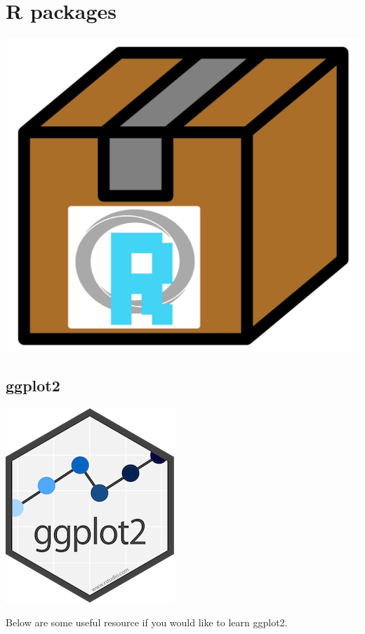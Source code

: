 \documentclass[
]{book}
\begin{document}
\hypertarget{r-packages}{%
\chapter{R packages}\label{r-packages}}

\includegraphics{figures/r_package.png}

\hypertarget{ggplot2_appendix}{%
\section{ggplot2}\label{ggplot2_appendix}}

\includegraphics{figures/ggplot2.png}

Below are some useful resource if you would like to learn ggplot2.
\end{document}
